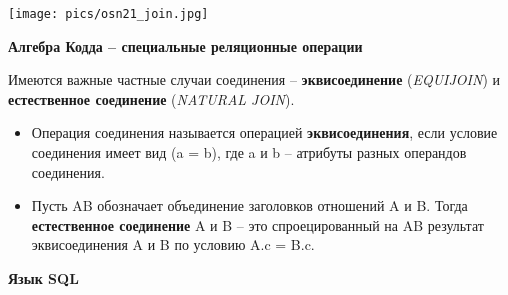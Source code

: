 \texttt{[image: pics/osn21\_join.jpg]}

\textbf{Алгебра Кодда -- специальные реляционные операции}

Имеются важные частные случаи соединения – \textbf{эквисоединение} (\textit{EQUIJOIN}) и \textbf{естественное соединение} (\textit{NATURAL JOIN}).
\begin{itemize}
    \item Операция соединения называется операцией \textbf{эквисоединения}, если условие соединения имеет вид (a = b), где a и b – атрибуты разных операндов соединения.
    \item Пусть AB обозначает объединение заголовков отношений A и B. Тогда \textbf{естественное соединение} A и B – это спроецированный на AB результат эквисоединения A и B по условию A.c = B.c.
\end{itemize}

\textbf{Язык SQL}

